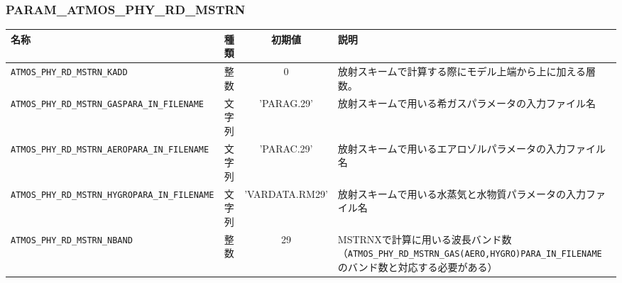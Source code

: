 

\subsubsection{PARAM\_ATMOS\_PHY\_RD\_MSTRN}
\begin{tabularx}{150mm}{|l|c|c|X|} \hline
 \rowcolor[gray]{0.9} 名称 & 種類 & 初期値 & 説明 \\ \hline
 \verb|ATMOS_PHY_RD_MSTRN_KADD| & 整数 & 0 & 放射スキームで計算する際にモデル上端から上に加える層数。 \\ \hline
 \verb|ATMOS_PHY_RD_MSTRN_GASPARA_IN_FILENAME| & 文字列 & 'PARAG.29' & 放射スキームで用いる希ガスパラメータの入力ファイル名 \\ \hline
 \verb|ATMOS_PHY_RD_MSTRN_AEROPARA_IN_FILENAME| & 文字列 & 'PARAC.29' & 放射スキームで用いるエアロゾルパラメータの入力ファイル名 \\ \hline
 \verb|ATMOS_PHY_RD_MSTRN_HYGROPARA_IN_FILENAME| & 文字列 & 'VARDATA.RM29' & 放射スキームで用いる水蒸気と水物質パラメータの入力ファイル名 \\ \hline
 \verb|ATMOS_PHY_RD_MSTRN_NBAND| & 整数 & 29 & MSTRNXで計算に用いる波長バンド数（\verb|ATMOS_PHY_RD_MSTRN_GAS(AERO,HYGRO)PARA_IN_FILENAME|のバンド数と対応する必要がある） \\ \hline
\end{tabularx}

